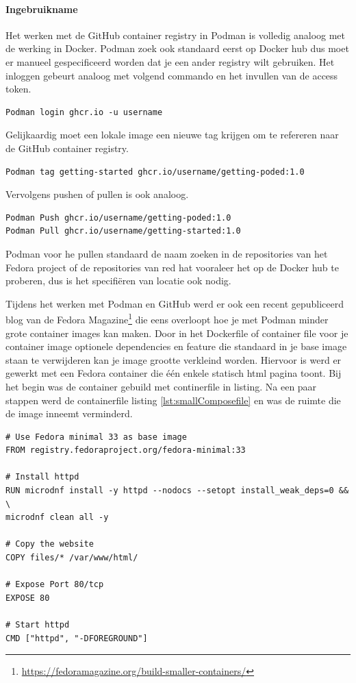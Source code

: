 \paragraph{Ingebruikname}
Het werken met de GitHub container registry in Podman is volledig analoog met de werking in Docker. Podman zoek ook standaard eerst op Docker hub dus moet er manueel gespecificeerd worden dat je een ander registry wilt gebruiken. Het inloggen gebeurt analoog met volgend commando en het invullen van de access token.
\begin{verbatim}
Podman login ghcr.io -u username
\end{verbatim}

Gelijkaardig moet een lokale image een nieuwe tag krijgen om te refereren naar de GitHub container registry.
\begin{verbatim}
Podman tag getting-started ghcr.io/username/getting-poded:1.0
\end{verbatim}

Vervolgens pushen of pullen is ook analoog.
\begin{verbatim}
Podman Push ghcr.io/username/getting-poded:1.0
Podman Pull ghcr.io/username/getting-started:1.0
\end{verbatim}

Podman voor he pullen standaard de naam zoeken in de repositories van het Fedora project of de repositories van red hat vooraleer het op de Docker hub te proberen, dus is het specifiëren van locatie ook nodig.

Tijdens het werken met Podman en GitHub werd er ook een recent gepubliceerd blog van de Fedora Magazine\footnote{\url{https://fedoramagazine.org/build-smaller-containers/}} die eens overloopt hoe je met Podman minder grote container images kan maken. Door in het Dockerfile of container file voor je container image optionele dependencies en feature die standaard in je base image staan te verwijderen kan je image grootte verkleind worden. Hiervoor is werd er gewerkt met een Fedora container die één enkele statisch html pagina toont. Bij het begin was de container gebuild met continerfile in listing. Na een paar stappen werd de containerfile listing \ref{lst:smallComposefile} en was de ruimte die de image inneemt verminderd.
\begin{lstlisting}[caption=inhoud van een containerfile die dormidel van een kleinere base en het weglaten van dependancies minder ruimte inneemt,label=lst:smallComposefile]
# Use Fedora minimal 33 as base image
FROM registry.fedoraproject.org/fedora-minimal:33

# Install httpd
RUN microdnf install -y httpd --nodocs --setopt install_weak_deps=0 && \
microdnf clean all -y

# Copy the website
COPY files/* /var/www/html/

# Expose Port 80/tcp
EXPOSE 80

# Start httpd
CMD ["httpd", "-DFOREGROUND"]
\end{lstlisting}

